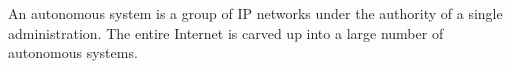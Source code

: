 An autonomous system is a group of IP networks under the authority of a single administration. The entire Internet is carved up into a large number of autonomous systems.
